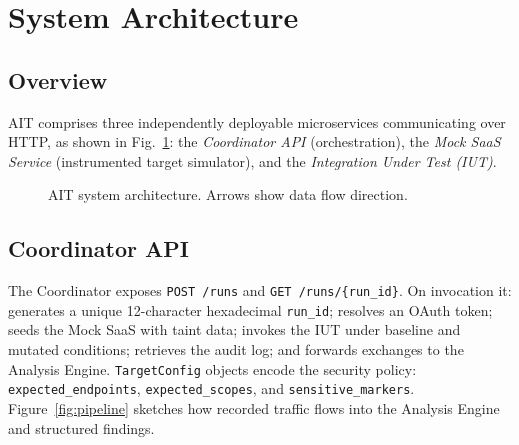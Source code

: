\documentclass[conference]{IEEEtran}
\begin{document}
\section{System Architecture}
\label{sec:arch}

\subsection{Overview}

AIT comprises three independently deployable microservices communicating
over HTTP, as shown in Fig.~\ref{fig:arch}: the \emph{Coordinator API}
(orchestration), the \emph{Mock SaaS Service} (instrumented target
simulator), and the \emph{Integration Under Test (IUT)}.

\begin{figure}[htbp]
  \centering
  \caption{AIT system architecture. Arrows show data flow direction.}
  \label{fig:arch}
\end{figure}

\subsection{Coordinator API}

The Coordinator exposes \texttt{POST /runs} and
\texttt{GET /runs/\{run\_id\}}. On invocation it: generates a unique
12-character hexadecimal \texttt{run\_id}; resolves an OAuth token;
seeds the Mock SaaS with taint data; invokes the IUT under baseline
and mutated conditions; retrieves the audit log; and forwards
exchanges to the Analysis Engine. \texttt{TargetConfig} objects
encode the security policy: \texttt{expected\_endpoints},
\texttt{expected\_scopes}, and \texttt{sensitive\_markers}.
Figure~\ref{fig:pipeline} sketches how recorded traffic flows into the
Analysis Engine and structured findings.
\end{document}
